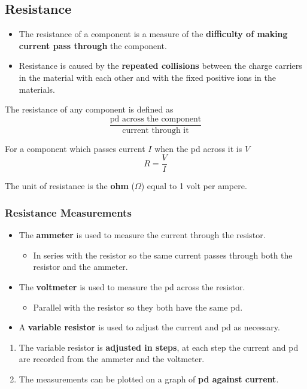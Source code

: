 \subsection{Resistance}

\begin{itemize}
    \item The resistance of a component is a measure of the \textbf{difficulty of making current pass through} the component.
    \item Resistance is caused by the \textbf{repeated collisions} between the charge carriers in the material with each other and with the fixed positive ions in the materials.
\end{itemize}

The resistance of any component is defined as
$$\frac{\text{pd across the component}}{\text{current through it}}$$

For a component which passes current $I$ when the pd across it is $V$
$$R=\frac{V}{I}$$

The unit of resistance is the \textbf{ohm} ($\Omega$) equal to 1 volt per ampere.

\subsubsection*{Resistance Measurements}

\begin{itemize}
    \item The \textbf{ammeter} is used to measure the current through the resistor.
        \begin{itemize}
            \item In series with the resistor so the same current passes through both the resistor and the ammeter.
        \end{itemize}
    \item The \textbf{voltmeter} is used to measure the pd across the resistor.
        \begin{itemize}
            \item Parallel with the resistor so they both have the same pd.
        \end{itemize}
    \item A \textbf{variable resistor} is used to adjust the current and pd as necessary.
\end{itemize}

\begin{enumerate}
    \item The variable resistor is \textbf{adjusted in steps}, at each step the current and pd are recorded from the ammeter and the voltmeter.
    \item The measurements can be plotted on a graph of \textbf{pd against current}.
\end{enumerate}

